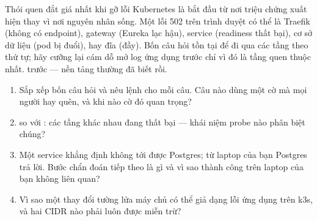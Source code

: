 \begin{pitfall}
Thói quen đắt giá nhất khi gỡ lỗi Kubernetes là bắt đầu từ nơi triệu
chứng xuất hiện thay vì nơi nguyên nhân sống. Một lỗi 502 trên trình
duyệt có thể là Traefik (không có endpoint), gateway (Eureka lạc
hậu), service (readiness thất bại), cơ sở dữ liệu (pod bị đuổi), hay
đĩa (đầy). Bốn câu hỏi tồn tại để đi qua các tầng theo thứ tự; hãy
cưỡng lại cám dỗ mở log ứng dụng trước chỉ vì đó là tầng quen thuộc
nhất.  trước  --- nền tảng thường đã biết
rồi.
\end{pitfall}

\begin{quiz}
\begin{enumerate}
  \item Sắp xếp bốn câu hỏi và nêu lệnh cho mỗi câu. Câu nào dùng một
  cờ mà mọi người hay quên, và khi nào cờ đó quan trọng?
  \item {} so với : các tầng
  khác nhau đang thất bại --- khái niệm probe nào phân biệt chúng?
  \item Một service khẳng định không tới được Postgres; từ laptop
  của bạn Postgres trả lời. Bước chẩn đoán tiếp theo là gì và vì sao
  thành công trên laptop của bạn không liên quan?
  \item Vì sao một thay đổi tường lửa máy chủ có thể giả dạng lỗi ứng
  dụng trên k3s, và hai CIDR nào phải luôn được miễn trừ?
\end{enumerate}
\end{quiz}
